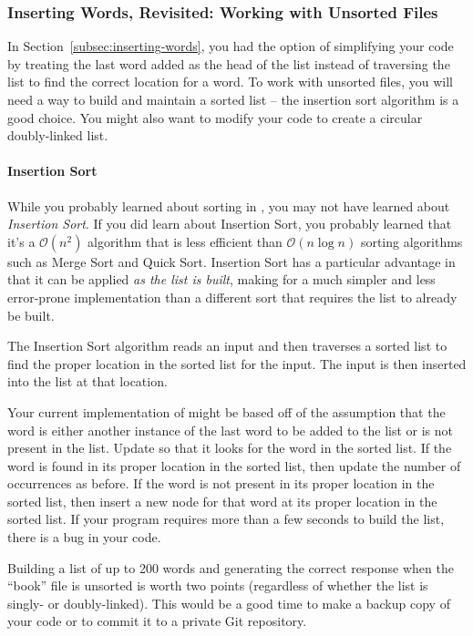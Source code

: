 \subsubsection{Inserting Words, Revisited: Working with Unsorted Files} \label{subsubsec:insertionsort}

In Section~\ref{subsec:inserting-words}, you had the option of simplifying your code by treating the last word added as the head of the list instead of traversing the list to find the correct location for a word.
To work with unsorted files, you will need a way to build and maintain a sorted list -- the insertion sort algorithm is a good choice.
You might also want to modify your code to create a circular doubly-linked list.

\paragraph{Insertion Sort}

While you probably learned about sorting in \cstwo, you may not have learned about \textit{Insertion Sort}.
If you did learn about Insertion Sort, you probably learned that it's a $\mathcal{O}(n^2)$ algorithm that is less efficient than $\mathcal{O}(n \log n)$ sorting algorithms such as Merge Sort and Quick Sort.
Insertion Sort has a particular advantage in that it can be applied \textit{as the list is built}, making for a much simpler and less error-prone implementation than a different sort that requires the list to already be built.

The Insertion Sort algorithm reads an input and then traverses a sorted list to find the proper location in the sorted list for the input.
The input is then inserted into the list at that location.

Your current implementation of  might be based off of the assumption that the word is either another instance of the last word to be added to the list or is not present in the list.
Update  so that it looks for the word in the sorted list.
If the word is found in its proper location in the sorted list, then update the number of occurrences as before.
If the word is not present in its proper location in the sorted list, then insert a new node for that word at its proper location in the sorted list.
If your program requires more than a few seconds to build the list, there is a bug in your code.

Building a list of up to 200 words and generating the correct response when the ``book'' file is unsorted is worth two points (regardless of whether the list is singly- or doubly-linked).
This would be a good time to make a backup copy of your code or to commit it to a private Git repository.

